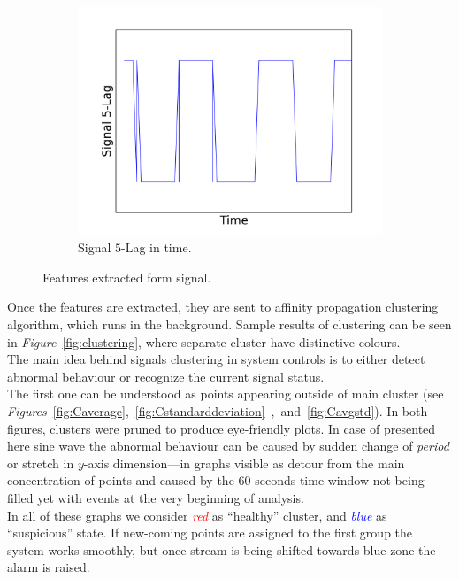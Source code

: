 \documentclass[11pt, letterpaper]{article}            %
\begin{document}
\begin{figure}[htbp]
  ~ %
  \begin{subfigure}[b]{0.49\textwidth}
    \includegraphics[width=\textwidth]{./gfx/feature3-1.png}
    \caption{Signal $5$-Lag in time.\label{fig:lag}}
  \end{subfigure}
  \caption{Features extracted form signal.\label{fig:features}}
\end{figure}

Once the features are extracted, they are sent to affinity propagation clustering algorithm, which runs in the background. Sample results of clustering can be seen in \emph{Figure}~\ref{fig:clustering}, where separate cluster have distinctive colours.\\
The main idea behind signals clustering in system controls is to either detect abnormal behaviour or recognize the current signal status.\\

The first one can be understood as points appearing outside of main cluster (see \emph{Figures}~\ref{fig:Caverage},~\ref{fig:Cstandarddeviation}~,~and~\ref{fig:Cavgstd}). In both figures, clusters were pruned to produce eye-friendly plots. In case of presented here sine wave the abnormal behaviour can be caused by sudden change of \emph{period} or stretch in $y$-axis dimension---in graphs visible as detour from the main concentration of points and caused by the 60-seconds time-window not being filled yet with events at the very beginning of analysis.\\
In all of these graphs we consider \emph{\textcolor{red}{red}} as ``healthy'' cluster, and \emph{\textcolor{blue}{blue}} as ``suspicious'' state. If new-coming points are assigned to the first group the system works smoothly, but once stream is being shifted towards blue zone the alarm is raised.\\
\end{document}
